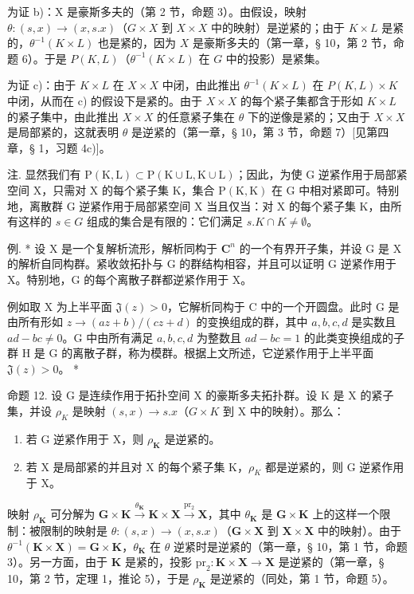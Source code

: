 为证 b)：X 是豪斯多夫的（第 2 节，命题 3）。由假设，映射 \(\theta: (s, x) \to (x, s.x)\)（\(G \times X\) 到 \(X \times X\) 中的映射）是逆紧的；由于 \(K \times L\) 是紧的，\(\theta^{-1}(K \times L)\) 也是紧的，因为 \(X\) 是豪斯多夫的（第一章，§ 10，第 2 节，命题 6）。于是 \(P(K, L)\)（\(\theta^{-1}(K \times L)\) 在 \(G\) 中的投影）是紧集。

为证 c)：由于 \(K \times L\) 在 \(X \times X\) 中闭，由此推出 \(\theta^{-1}(K \times L)\) 在 \(P(K, L) \times K\) 中闭，从而在 c) 的假设下是紧的。由于 \(X \times X\) 的每个紧子集都含于形如 \(K \times L\) 的紧子集中，由此推出 \(X \times X\) 的任意紧子集在 \(\theta\) 下的逆像是紧的；又由于 \(X \times X\) 是局部紧的，这就表明 \(\theta\) 是逆紧的（第一章，§ 10，第 3 节，命题 7）{[}见第四章，§ 1，习题 4c){]}。

注. 显然我们有 \(\mathrm{P}(\mathrm{K},\mathrm{L})\subset\mathrm{P}(\mathrm{K}\cup\mathrm{L},\mathrm{K}\cup\mathrm{L})\)；因此，为使 G 逆紧作用于局部紧空间 X，只需对 X 的每个紧子集 K，集合 \(\mathrm{P}(\mathrm{K},\mathrm{K})\) 在 G 中相对紧即可。特别地，离散群 G 逆紧作用于局部紧空间 X 当且仅当：对 X 的每个紧子集 K，由所有这样的 \(s\in G\) 组成的集合是有限的：它们满足 \(s.K\cap K\neq\emptyset\)。

例. * 设 X 是一个复解析流形，解析同构于 \(\mathbf{C}^n\) 的一个有界开子集，并设 G 是 X 的解析自同构群。紧收敛拓扑与 G 的群结构相容，并且可以证明 G 逆紧作用于 X。特别地，G 的每个离散子群都逆紧作用于 X。

例如取 X 为上半平面 \(\mathfrak{J}(z)>0\)，它解析同构于 C 中的一个开圆盘。此时 G 是由所有形如 \(z\to (az+b)/(cz+d)\) 的变换组成的群，其中 \(a,b,c,d\) 是实数且 \(ad-bc\neq0\)。G 中由所有满足 \(a,b,c,d\) 为整数且 \(ad-bc=1\) 的此类变换组成的子群 H 是 G 的离散子群，称为模群。根据上文所述，它逆紧作用于上半平面 \(\mathfrak{J}(z)>0\)。 *

命题 12. 设 G 是连续作用于拓扑空间 X 的豪斯多夫拓扑群。设 K 是 X 的紧子集，并设 \(\rho_{K}\) 是映射 \((s, x) \to s.x\)（\(G \times K\) 到 X 中的映射）。那么：

\begin{enumerate}
\def\labelenumi{\alph{enumi})}
\item
  若 G 逆紧作用于 X，则 \(\rho_{\mathbf{K}}\) 是逆紧的。
\item
  若 X 是局部紧的并且对 X 的每个紧子集 K，\(\rho_{K}\) 都是逆紧的，则 G 逆紧作用于 X。
\end{enumerate}

映射 \(\rho_{\mathbf{K}}\) 可分解为 \(\mathbf{G} \times \mathbf{K} \xrightarrow{\theta_{\mathbf{K}}} \mathbf{K} \times \mathbf{X} \xrightarrow{\mathrm{pr}_2} \mathbf{X}\)，其中 \(\theta_{\mathbf{K}}\) 是 \(\mathbf{G} \times \mathbf{K}\) 上的这样一个限制：被限制的映射是 \(\theta: (s, x) \to (x, s.x)\)（\(\mathbf{G} \times \mathbf{X}\) 到 \(\mathbf{X} \times \mathbf{X}\) 中的映射）。由于 \(\theta^{-1}(\mathbf{K} \times \mathbf{X}) = \mathbf{G} \times \mathbf{K}\)，\(\theta_{\mathbf{K}}\) 在 \(\theta\) 逆紧时是逆紧的（第一章，§ 10，第 1 节，命题 3）。另一方面，由于 \(\mathbf{K}\) 是紧的，投影 \(\mathrm{pr}_2: \mathbf{K} \times \mathbf{X} \to \mathbf{X}\) 是逆紧的（第一章，§ 10，第 2 节，定理 1，推论 5），于是 \(\rho_{\mathbf{K}}\) 是逆紧的（同处，第 1 节，命题 5）。

